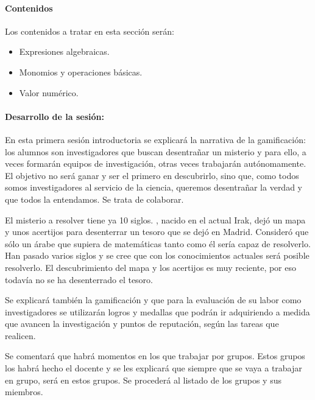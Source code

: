 \paragraph{Contenidos}

Los contenidos a tratar en esta sección serán:

\begin{itemize}
\item Expresiones algebraicas.
\item Monomios y operaciones básicas.
\item Valor numérico.
\end{itemize}

\paragraph{Desarrollo de la sesión: }

En esta primera sesión introductoria se explicará la narrativa de la gamificación: 
%
los alumnos son investigadores que buscan desentrañar un misterio y para ello, a veces formarán equipos de investigación, otras veces trabajarán autónomamente.
%
El objetivo no será ganar y ser el primero en descubrirlo, sino que, como todos somos investigadores al servicio de la ciencia, queremos desentrañar la verdad y que todos la entendamos.
%
Se trata de colaborar.

El misterio a resolver tiene ya 10 siglos.
%
\Arab, nacido en el actual Irak, dejó un mapa y unos acertijos para desenterrar un tesoro que se dejó en Madrid.
%
Consideró que sólo un árabe que supiera de matemáticas tanto como él sería capaz de resolverlo.
%
Han pasado varios siglos y se cree que con los conocimientos actuales será posible resolverlo.
%
El descubrimiento del mapa y los acertijos es muy reciente, por eso todavía no se ha desenterrado el tesoro.

Se explicará también la gamificación y que para la evaluación de su labor como investigadores se utilizarán logros y medallas que podrán ir adquiriendo a medida que avancen la investigación y puntos de reputación, según las tareas que realicen.

Se comentará que habrá momentos en los que trabajar por grupos.
%
Estos grupos los habrá hecho el docente  y se les explicará que siempre que se vaya a trabajar en grupo, será en estos grupos.
%
Se procederá al listado de los grupos y sus miembros.

